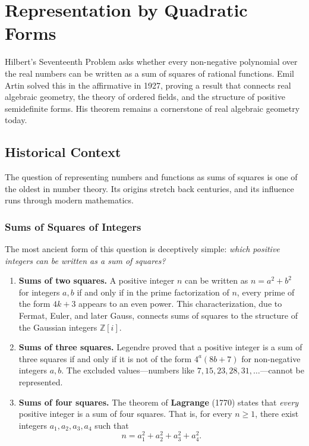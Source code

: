 
\chapter{Representation by Quadratic Forms}

\begin{solvedbox}
Hilbert's Seventeenth Problem asks whether every non-negative polynomial over the real numbers can be written as a sum of squares of rational functions. Emil Artin solved this in the affirmative in 1927, proving a result that connects real algebraic geometry, the theory of ordered fields, and the structure of positive semidefinite forms. His theorem remains a cornerstone of real algebraic geometry today.
\end{solvedbox}

\section{Historical Context}

The question of representing numbers and functions as sums of squares is one of the oldest in number theory. Its origins stretch back centuries, and its influence runs through modern mathematics.

\subsection{Sums of Squares of Integers}

The most ancient form of this question is deceptively simple: \emph{which positive integers can be written as a sum of squares?}

\begin{enumerate}
    \item \textbf{Sums of two squares.} A positive integer $n$ can be written as $n = a^2 + b^2$ for integers $a, b$ if and only if in the prime factorization of $n$, every prime of the form $4k+3$ appears to an even power. This characterization, due to Fermat, Euler, and later Gauss, connects sums of squares to the structure of the Gaussian integers $\mathbb{Z}[i]$.

    \item \textbf{Sums of three squares.} Legendre proved that a positive integer is a sum of three squares if and only if it is not of the form $4^a(8b+7)$ for non-negative integers $a, b$. The excluded values---numbers like $7, 15, 23, 28, 31, \ldots$---cannot be represented.

    \item \textbf{Sums of four squares.} The theorem of \textbf{Lagrange} (1770) states that \emph{every} positive integer is a sum of four squares. That is, for every $n \geq 1$, there exist integers $a_1, a_2, a_3, a_4$ such that
    \[
        n = a_1^2 + a_2^2 + a_3^2 + a_4^2.
    \]
\end{enumerate}

